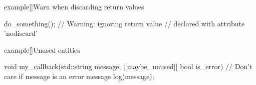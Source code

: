 \begin{frame}[fragile]{}
\begin{onlyenv}
\begin{varblock}{example}[\textwidth]{Warn when discarding return values}
\begin{Cpp}
                do_something(); // Warning: ignoring return value
                                // declared with attribute 'nodiscard'
            \end{Cpp}
        \end{varblock}
        \bigskip
        \begin{varblock}{example}[\textwidth]{Unused entities}
            \begin{Cpp}
                void my_callback(std::string message,
                                 [[maybe_unused]] bool is_error) {
                    // Don't care if message is an error message
                    log(message);
                }
            \end{Cpp}
        \end{varblock}
    \end{onlyenv}
\end{frame}


